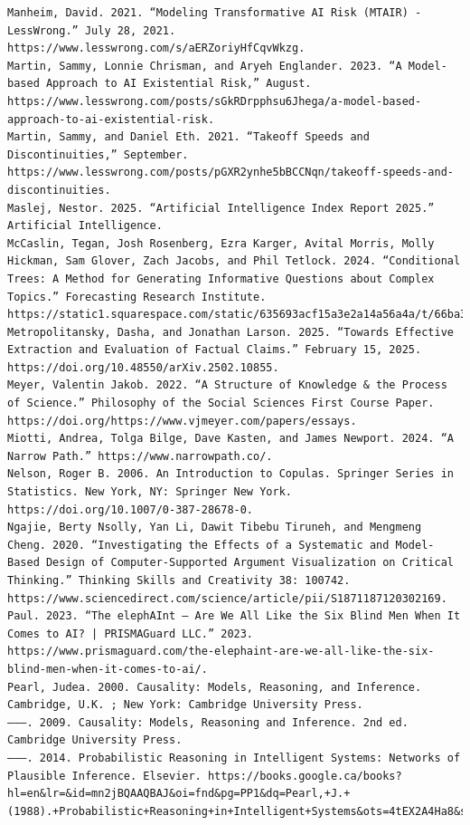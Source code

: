 \documentclass[
  11pt,
  letterpaper,
]{book}
\begin{document}
\begin{verbatim}
Manheim, David. 2021. “Modeling Transformative AI Risk (MTAIR) - LessWrong.” July 28, 2021. https://www.lesswrong.com/s/aERZoriyHfCqvWkzg.
Martin, Sammy, Lonnie Chrisman, and Aryeh Englander. 2023. “A Model-based Approach to AI Existential Risk,” August. https://www.lesswrong.com/posts/sGkRDrpphsu6Jhega/a-model-based-approach-to-ai-existential-risk.
Martin, Sammy, and Daniel Eth. 2021. “Takeoff Speeds and Discontinuities,” September. https://www.lesswrong.com/posts/pGXR2ynhe5bBCCNqn/takeoff-speeds-and-discontinuities.
Maslej, Nestor. 2025. “Artificial Intelligence Index Report 2025.” Artificial Intelligence.
McCaslin, Tegan, Josh Rosenberg, Ezra Karger, Avital Morris, Molly Hickman, Sam Glover, Zach Jacobs, and Phil Tetlock. 2024. “Conditional Trees: A Method for Generating Informative Questions about Complex Topics.” Forecasting Research Institute. https://static1.squarespace.com/static/635693acf15a3e2a14a56a4a/t/66ba37a144f1d6095de467df/1723479995772/AIConditionalTrees.pdf.
Metropolitansky, Dasha, and Jonathan Larson. 2025. “Towards Effective Extraction and Evaluation of Factual Claims.” February 15, 2025. https://doi.org/10.48550/arXiv.2502.10855.
Meyer, Valentin Jakob. 2022. “A Structure of Knowledge & the Process of Science.” Philosophy of the Social Sciences First Course Paper. https://doi.org/https://www.vjmeyer.com/papers/essays.
Miotti, Andrea, Tolga Bilge, Dave Kasten, and James Newport. 2024. “A Narrow Path.” https://www.narrowpath.co/.
Nelson, Roger B. 2006. An Introduction to Copulas. Springer Series in Statistics. New York, NY: Springer New York. https://doi.org/10.1007/0-387-28678-0.
Ngajie, Berty Nsolly, Yan Li, Dawit Tibebu Tiruneh, and Mengmeng Cheng. 2020. “Investigating the Effects of a Systematic and Model-Based Design of Computer-Supported Argument Visualization on Critical Thinking.” Thinking Skills and Creativity 38: 100742. https://www.sciencedirect.com/science/article/pii/S1871187120302169.
Paul. 2023. “The elephAInt – Are We All Like the Six Blind Men When It Comes to AI? | PRISMAGuard LLC.” 2023. https://www.prismaguard.com/the-elephaint-are-we-all-like-the-six-blind-men-when-it-comes-to-ai/.
Pearl, Judea. 2000. Causality: Models, Reasoning, and Inference. Cambridge, U.K. ; New York: Cambridge University Press.
———. 2009. Causality: Models, Reasoning and Inference. 2nd ed. Cambridge University Press.
———. 2014. Probabilistic Reasoning in Intelligent Systems: Networks of Plausible Inference. Elsevier. https://books.google.ca/books?hl=en&lr=&id=mn2jBQAAQBAJ&oi=fnd&pg=PP1&dq=Pearl,+J.+(1988).+Probabilistic+Reasoning+in+Intelligent+Systems&ots=4tEX2A4Ha8&sig=lgUs_RCoeXEEuGwM5xMEoyJy4HI.

\end{verbatim}
\end{document}
